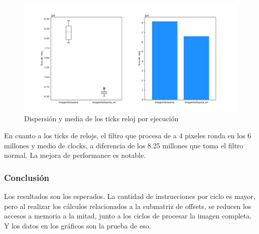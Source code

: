 \begin{figure}[!h]
    \begin{center}
	\includegraphics[scale=0.55]{img/x42.jpeg}
	\end{center}
	\caption{Dispersión y media de los ticks reloj por ejecución}
	\label{exp2_c}
\end{figure}

En cuanto a los ticks de relojs, el filtro que procesa de a 4 pixeles ronda en los 6 millones y medio de clocks, a diferencia de los 8.25 millones que toma el filtro normal.
La mejora de performance es notable.

\subsubsection{Conclusión}
 Los resultados son los esperados. La cantidad de instrucciones por ciclo es mayor, pero al realizar los cálculos relacionados a la submatriz de offsets, se reducen los accesos a memoria a la mitad, junto a los ciclos de procesar la imagen completa. Y los datos en los gráficos son la prueba de eso.
